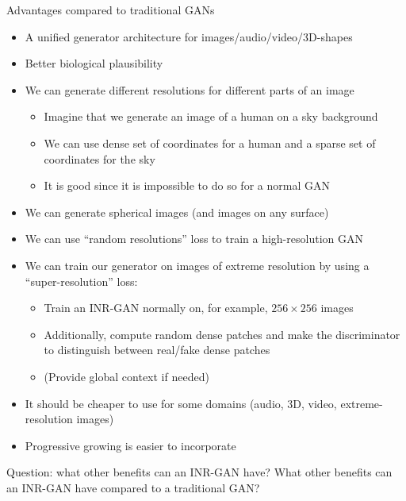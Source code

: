 \documentclass[10pt, handout]{beamer}
\begin{document}
\begin{frame}{Advantages compared to traditional GANs}
\begin{itemize}
    \pause\item A unified generator architecture for images/audio/video/3D-shapes
    \pause\item Better biological plausibility
    \pause\item We can generate different resolutions for different parts of an image
    \begin{itemize}
        \pause\item Imagine that we generate an image of a human on a sky background
        \pause\item We can use dense set of coordinates for a human and a sparse set of coordinates for the sky
        \pause\item It is good since it is impossible to do so for a normal GAN
    \end{itemize}
    \pause\item We can generate spherical images (and images on any surface)
    \pause\item We can use ``random resolutions'' loss to train a high-resolution GAN
    \pause\item We can train our generator on images of extreme resolution by using a ``super-resolution'' loss:
    \begin{itemize}
        \pause\item Train an INR-GAN normally on, for example, $256\times256$ images
        \pause\item Additionally, compute random dense patches and make the discriminator to distinguish between real/fake dense patches
        \pause\item (Provide global context if needed)
    \end{itemize}
    \item\pause It should be cheaper to use for some domains (audio, 3D, video, extreme-resolution images)
    \item\pause Progressive growing is easier to incorporate
\end{itemize}
\end{frame}


\begin{frame}{Question: what other benefits can an INR-GAN have?}
What other benefits can an INR-GAN have compared to a traditional GAN?
\end{frame}
\end{document}
